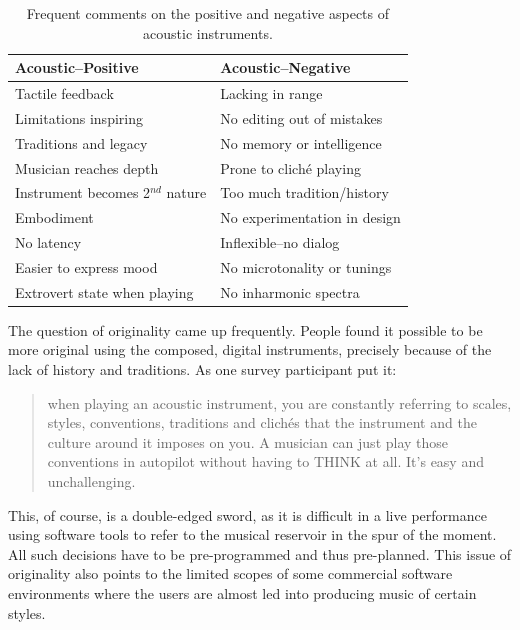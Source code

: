 \begin{table}[t]
\centering
{}
\caption{Frequent comments on the positive and negative aspects of acoustic instruments.}
\vspace{3pt} \noindent
\begin{tabular}{ll}
\toprule
\textbf{Acoustic--Positive}     & \textbf{Acoustic--Negative}  \\
\midrule  
Tactile feedback		&		Lacking in range \\
Limitations inspiring		&		No editing out of mistakes \\
Traditions and legacy	&		No memory or intelligence \\
Musician reaches depth	&		Prone to clich\'e playing \\
Instrument becomes 2$^{nd}$ nature  \hspace{1cm} &	Too much tradition/history \\
Embodiment		&	No experimentation in design \\
No latency			&		Inflexible--no dialog \\
Easier to express mood		&	No microtonality or tunings \\
Extrovert state when playing	&	No inharmonic spectra \\
\bottomrule
\end{tabular}
\end{table}

The question of originality came up frequently. People found it possible to be
more original using the composed, digital instruments, precisely because of the
lack of history and traditions. As one survey participant put it: 

\begin{quotation}
when playing
an acoustic instrument, you are constantly referring to scales, styles,
conventions, traditions and clich\'{e}s that the instrument and the culture
around it imposes on you. A musician can just play those conventions in autopilot
without having to THINK at all. It's easy and unchallenging.
\end{quotation}

This, of course, is a double-edged sword, as it is difficult in a live performance using software tools to refer to the musical reservoir in the spur of the moment. All such decisions have to be pre-programmed and thus pre-planned. This issue of originality also points to the limited scopes of some commercial software environments where the users are almost led into producing music of certain styles.

